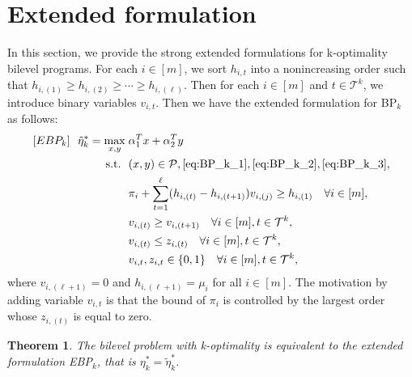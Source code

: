 \documentclass[11pt]{article}
\newtheorem{theorem}{Theorem}
\newcommand{\T}{\mathcal{T}}
\newcommand{\Pp}{\mathcal{P}}
\begin{document}
\section{Extended formulation}
In this section, we provide the strong extended formulations for k-optimality bilevel programs. For each $i\in [m]$, we sort $h_{i,t}$ into a nonincreasing order such that $h_{i,(1)} \geq h_{i,(2)} \geq \cdots \geq h_{i, (\ell)}$. Then for each $i\in [m]$ and $t\in \T^k$, we introduce binary variables $v_{i, t}$. Then we have the extended formulation for BP$_k$ as follows:
\begin{subequations}
	\begin{align}
	[EBP_k]~~\tilde{\eta}_k^* = \max_{x, y}\; & \alpha_1^Tx + \alpha_2^Ty \nonumber \\
	\text{s.t.~~} &  (x, y)\in \Pp, \eqref{eq:BP_k_1}, \eqref{eq:BP_k_2}, \eqref{eq:BP_k_3}, \nonumber \\
	& \pi_i + \sum_{t=1}^{\ell}(h_{i,(t)} - h_{i,(t+1)})v_{i,(j)} \geq h_{i, (1)} \quad \forall i \in [m], \label{eq:EBP_k_1}\\
	& v_{i,(t)} \geq v_{i,(t+1)} \quad \forall i \in [m], t\in \T^k, \label{eq:EBP_k_2}\\
	& v_{i,(t)} \leq z_{i,(t)} \quad \forall i \in [m], t\in \T^k, \label{eq:EBP_k_3}\\
	& v_{i,t}, z_{i,t} \in \{0,1\}  \quad \forall i \in [m], t\in \T^k,  \nonumber 
	\end{align}
\end{subequations}
where $v_{i,(\ell+1)} = 0$ and $h_{i,(\ell+1)} = \mu_i$ for all $i\in [m]$. The motivation by adding variable $v_{i,t}$ is that the bound of $\pi_i$ is controlled by the largest order whose $z_{i, (t)}$ is equal to zero.  


\begin{theorem}
	The bilevel problem with k-optimality is equivalent to the extended formulation EBP$_k$, that is	$\eta_k^* = \tilde{\eta}_k^*.$
\end{theorem}
\end{document}
